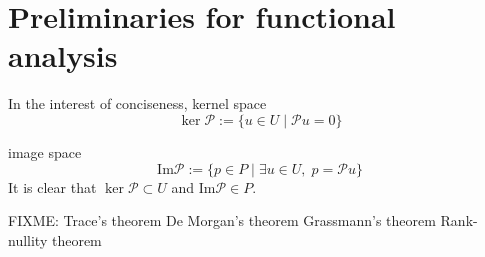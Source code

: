 \section{Preliminaries for functional analysis}\label{sec:functional}

In the interest of conciseness, 
kernel space
\begin{equation}
    \ker \mathcal P:=\{u\in U\;\vert\; \mathcal P u = 0\}
\end{equation}

image space
\begin{equation}
    \mathrm{Im} \mathcal P:=\{p \in P\;\vert\; \exists u \in U, \; p = \mathcal Pu\}
\end{equation}
It is clear that $\ker \mathcal P \subset U$ and $\mathrm{Im} \mathcal P \in P$.

FIXME:
Trace's theorem
De Morgan's theorem
Grassmann's theorem
Rank-nullity theorem

